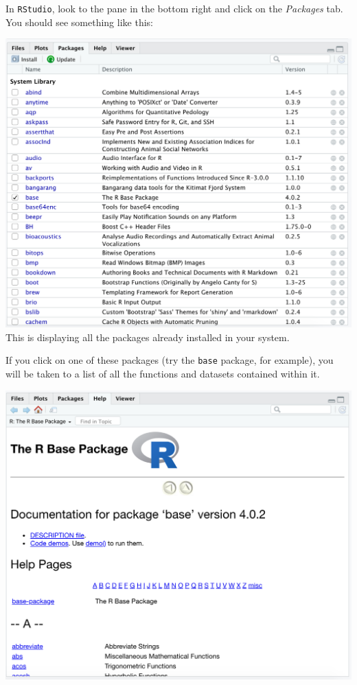 \documentclass[
]{book}
\begin{document}
In \texttt{RStudio}, look to the pane in the bottom right and click on the \emph{Packages} tab. You should see something like this:

\includegraphics{img/rstudio_packages.png}
This is displaying all the packages already installed in your system.

If you click on one of these packages (try the \texttt{base} package, for example), you will be taken to a list of all the functions and datasets contained within it.

\includegraphics{img/rstudio_base-package.png}
\end{document}
